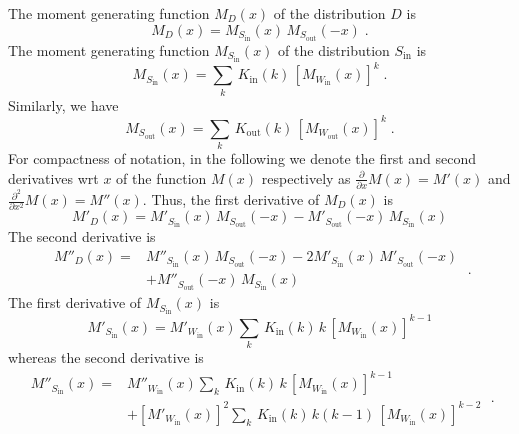 \documentclass[a4paper,pre,superscriptaddress,floatfix,nofootinbib,twocolumn]{revtex4-1}
\begin{document}
The moment generating function $M_D(x)$ of the distribution $D$ is
\[
M_D(x) = M_{S_\text{in}}(x) \, M_{S_\text{out}}(-x) \; .
\]
The moment generating function $M_{S_\text{in}}(x)$ of the distribution $S_\text{in}$ is
\[
M_{S_\text{in}}(x) =
\sum_{k}
\, K_\text{in}(k) \, \left[ M_{W_\text{in}}(x) \right]^k \;.
\]
Similarly, we have
\[
M_{S_\text{out}}(x) =
\sum_{k} \, K_\text{out}(k) \, \left[ M_{W_\text{out}}(x) \right]^k \; .
\]
For compactness of notation, in the following we denote the first and second derivatives wrt $x$ of the function $M(x)$ respectively as $\frac{\partial}{\partial x} M(x) = M'(x)$ and $\frac{\partial^2}{\partial x^2} M(x) = M''(x) $. Thus,
the first derivative of $M_D(x)$ is
\[
M'_D(x)   = M'_{S_\text{in}}(x)\, M_{S_\text{out}}(-x)   - M'_{S_\text{out}}(-x)  \, M_{S_\text{in}}(x)
\]
The second derivative is
\[
\begin{array}{ll}
M''_D(x) = & M''_{S_\text{in}}(x)\, M_{S_\text{out}}(-x)
- 2 M'_{S_\text{in}}(x)\, M'_{S_\text{out}}(-x)
\\
& + M''_{S_\text{out}}(-x)  \, M_{S_\text{in}}(x)
\end{array}
\; .
\]
The first derivative of $M_{S_\text{in}}(x)$ is
\[
M'_{S_\text{in}}(x) =
M'_{W_\text{in}}(x) \sum_{k}\, K_\text{in}(k) \, k \,  \left[ M_{W_\text{in}}(x) \right]^{k-1}
\]
whereas the second derivative is
\[
\begin{array}{ll}
M''_{S_\text{in}}(x) = &
M''_{W_\text{in}}(x) \sum_{k} \, K_\text{in}(k) \, k \,  \left[ M_{W_\text{in}}(x) \right]^{k-1}
\\
& + [M'_{W_\text{in}}(x)]^2 \sum_{k} \, K_\text{in}(k) \, k (k-1) \,  \left[ M_{W_\text{in}}(x) \right]^{k-2}
\end{array}
\; .
\]
\end{document}
